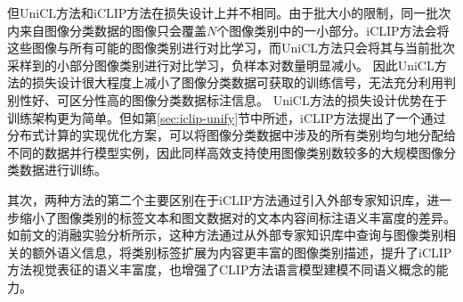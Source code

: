 但UniCL方法和iCLIP方法在损失设计上并不相同。由于批大小的限制，同一批次内来自图像分类数据的图像只会覆盖$N$个图像类别中的一小部分。iCLIP方法会将这些图像与所有可能的图像类别进行对比学习，而UniCL方法只会将其与当前批次采样到的小部分图像类别进行对比学习，负样本对数量明显减小。
因此UniCL方法的损失设计很大程度上减小了图像分类数据可获取的训练信号，无法充分利用判别性好、可区分性高的图像分类数据标注信息。
UniCL方法的损失设计优势在于训练架构更为简单。但如第\ref{sec:iclip-unify}节中所述，iCLIP方法提出了一个通过分布式计算的实现优化方案，可以将图像分类数据中涉及的所有类别均匀地分配给不同的数据并行模型实例，因此同样高效支持使用图像类别数较多的大规模图像分类数据进行训练。%

其次，两种方法的第二个主要区别在于iCLIP方法通过引入外部专家知识库，进一步缩小了图像类别的标签文本和图文数据对的文本内容间标注语义丰富度的差异。如前文的消融实验分析所示，这种方法通过从外部专家知识库中查询与图像类别相关的额外语义信息，将类别标签扩展为内容更丰富的图像类别描述，提升了iCLIP方法视觉表征的语义丰富度，也增强了CLIP方法语言模型建模不同语义概念的能力。


